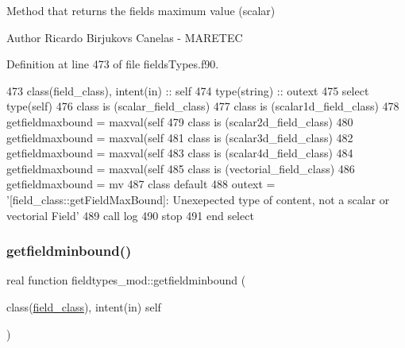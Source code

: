 Method that returns the field\textquotesingle{}s maximum value (scalar) 

\begin{DoxyAuthor}{Author}
Ricardo Birjukovs Canelas -\/ M\+A\+R\+E\+T\+EC 
\end{DoxyAuthor}


Definition at line 473 of file fields\+Types.\+f90.


\begin{DoxyCode}
473     \textcolor{keywordtype}{class}(field\_class), \textcolor{keywordtype}{intent(in)} :: self
474     \textcolor{keywordtype}{type}(string) :: outext
475     \textcolor{keywordflow}{select type}(self)
476 \textcolor{keywordflow}{    class is} (scalar\_field\_class)
477 \textcolor{keywordflow}{        class is} (scalar1d\_field\_class)
478             getfieldmaxbound = maxval(self%
479 \textcolor{keywordflow}{        class is} (scalar2d\_field\_class)
480             getfieldmaxbound = maxval(self%
481 \textcolor{keywordflow}{        class is} (scalar3d\_field\_class)
482             getfieldmaxbound = maxval(self%
483 \textcolor{keywordflow}{        class is} (scalar4d\_field\_class)
484             getfieldmaxbound = maxval(self%
485 \textcolor{keywordflow}{    class is} (vectorial\_field\_class)
486         getfieldmaxbound = mv
487 \textcolor{keywordflow}{        class default}
488         outext = \textcolor{stringliteral}{'[field\_class::getFieldMaxBound]: Unexepected type of content, not a scalar or vectorial
       Field'}
489         \textcolor{keyword}{call }log%
490         stop
491 \textcolor{keywordflow}{    end select}
\end{DoxyCode}
\mbox{\label{namespacefieldtypes__mod_a6811e4246f656bb9074955c5c7c107e8}} 
\subsubsection{\texorpdfstring{getfieldminbound()}{getfieldminbound()}}
{\footnotesize\ttfamily real function fieldtypes\+\_\+mod\+::getfieldminbound (\begin{DoxyParamCaption}\item[{class(\mbox{\hyperlink{structfieldtypes__mod_1_1field__class}{field\+\_\+class}}), intent(in)}]{self }\end{DoxyParamCaption})\hspace{0.3cm}{\ttfamily [private]}}



